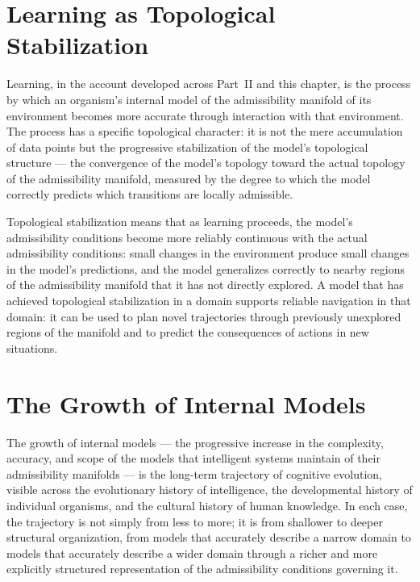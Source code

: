\documentclass[12pt,openany]{book}
\theoremstyle{plain}
\theoremstyle{definition}
\theoremstyle{remark}
\begin{document}
\section{Learning as Topological Stabilization}

Learning, in the account developed across Part~II and this chapter, is the process by which an organism's internal model of the admissibility manifold of its environment becomes more accurate through interaction with that environment. The process has a specific topological character: it is not the mere accumulation of data points but the progressive stabilization of the model's topological structure — the convergence of the model's topology toward the actual topology of the admissibility manifold, measured by the degree to which the model correctly predicts which transitions are locally admissible.

Topological stabilization means that as learning proceeds, the model's admissibility conditions become more reliably continuous with the actual admissibility conditions: small changes in the environment produce small changes in the model's predictions, and the model generalizes correctly to nearby regions of the admissibility manifold that it has not directly explored. A model that has achieved topological stabilization in a domain supports reliable navigation in that domain: it can be used to plan novel trajectories through previously unexplored regions of the manifold and to predict the consequences of actions in new situations.

\section{The Growth of Internal Models}

The growth of internal models — the progressive increase in the complexity, accuracy, and scope of the models that intelligent systems maintain of their admissibility manifolds — is the long-term trajectory of cognitive evolution, visible across the evolutionary history of intelligence, the developmental history of individual organisms, and the cultural history of human knowledge. In each case, the trajectory is not simply from less to more; it is from shallower to deeper structural organization, from models that accurately describe a narrow domain to models that accurately describe a wider domain through a richer and more explicitly structured representation of the admissibility conditions governing it.
\end{document}
